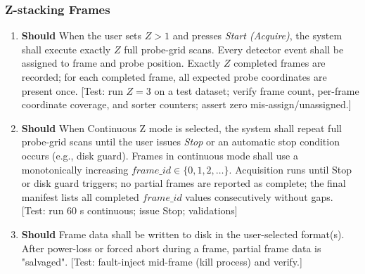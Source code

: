 \documentclass[12pt]{article}
\newcommand{\PriorityTag}[2]{%
  \colorbox{#2!25}{\footnotesize\textsf{\textbf{#1}}}\hspace{0.6em}}
\newcommand{\should}{\leavevmode\PriorityTag{Should}{yellow}}
\newcounter{reqgrp}[section] %
\newcounter{reqno}
\newcommand{\reqprefix}{GEN}
\newenvironment{requirements}[1]{%
  \renewcommand{\reqprefix}{#1}%
  \refstepcounter{reqgrp}%
  \setcounter{reqno}{0}%
  \begin{enumerate}[leftmargin=*]
}{\end{enumerate}}
\begin{document}
\subsubsection{Z-stacking Frames}
\begin{requirements}{ZST}

\item \should {}
  {When the user sets \(Z>1\) and presses \emph{Start (Acquire)}, the system shall execute exactly \(Z\) full probe-grid scans. Every detector event shall be assigned to frame and probe position. }
  {Exactly \(Z\) completed frames are recorded; for each completed frame, all expected probe coordinates are present once.}
  [Test: run \(Z=3\) on a test dataset; verify frame count, per-frame coordinate coverage, and sorter counters; assert zero mis-assign/unassigned.]

\item \should {}
  {When Continuous Z mode is selected, the system shall repeat full probe-grid scans until the user issues \emph{Stop} or an automatic stop condition occurs (e.g., disk guard). Frames in continuous mode shall use a monotonically increasing \(\textit{frame\_id}\in\{0,1,2,\dots\}\).}
  {Acquisition runs until Stop or disk guard triggers; no partial frames are reported as complete; the final manifest lists all completed \(\textit{frame\_id}\) values consecutively without gaps.}
  [Test: run 60 s continuous; issue Stop; validations]

\item \should {}
  {Frame data shall be written to disk in the user-selected format(s).}
  {After power-loss or forced abort during a frame, partial frame data is "salvaged".}
  [Test: fault-inject mid-frame (kill process) and verify.]


\end{requirements}
\end{document}
